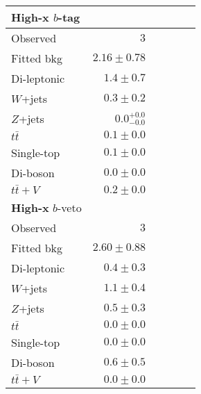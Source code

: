 \begin{tabular*}{\textwidth}{@{\extracolsep{\fill}}lrrrrr}
\toprule
\textbf{High-x} $b$-tag &  \\
\midrule

Observed          & $3$                    \\
\midrule
Fitted bkg         & $2.16 \pm 0.78$              \\
\midrule
        Di-leptonic         & $1.4 \pm 0.7$              \\
        $W$+jets         & $0.3 \pm 0.2$              \\
        $Z$+jets         & $0.0_{-0.0}^{+0.0}$              \\
        $t\bar{t}$         & $0.1 \pm 0.0$              \\
        Single-top         & $0.1 \pm 0.0$              \\
        Di-boson         & $0.0 \pm 0.0$              \\
        $t\bar{t}+V$         & $0.2 \pm 0.0$              \\
\toprule
\textbf{High-x} $b$-veto &  \\
\midrule
Observed          & $3$                    \\
\midrule
Fitted bkg         & $2.60 \pm 0.88$              \\
\midrule
        Di-leptonic         & $0.4 \pm 0.3$              \\
        $W$+jets         & $1.1 \pm 0.4$              \\
        $Z$+jets         & $0.5 \pm 0.3$              \\
        $t\bar{t}$         & $0.0 \pm 0.0$              \\
        Single-top         & $0.0 \pm 0.0$              \\
        Di-boson         & $0.6 \pm 0.5$              \\
        $t\bar{t}+V$         & $0.0 \pm 0.0$              \\


\bottomrule
\end{tabular*}




